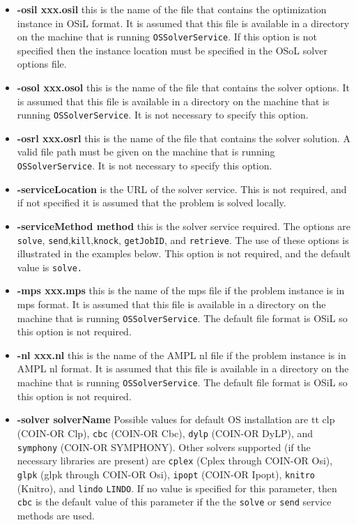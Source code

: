 \documentclass[11pt]{article}
\renewcommand{\_}{{\char"5F}}
\renewcommand{\{}{{\char"7B}}
\renewcommand{\}}{{\char"7D}}
\renewcommand{\^}{{\char"0D}}
\renewcommand{\'}{{\char"0D}}
\begin{document}
\begin{itemize}

\item[] {\bf -osil xxx.osil}  this is the name of the file that contains the optimization instance in OSiL format. It is assumed that this file is available in a directory on the machine that is running {\tt OSSolverService}. If this option is not specified then the instance location must be specified in the OSoL solver options file.

\item[] {\bf -osol xxx.osol}  this is the name of the file that contains the solver options. It is assumed that this file is available in a directory on the machine that is running {\tt OSSolverService}. It is not necessary to specify this option.

\item[] {\bf -osrl xxx.osrl}  this is the name of the file that contains the solver solution. A valid file path must be given on the machine that is running {\tt OSSolverService}. It is not necessary to specify this option.

\item[] {\bf -serviceLocation}  is the URL of the solver service. This is not required, and if not specified it is assumed that the problem is solved locally. 

\item[] {\bf -serviceMethod  method}  this is  the solver service required. The options are {\tt solve}, {\tt send},{\tt kill},{\tt knock}, {\tt getJobID}, and {\tt retrieve}. The use of these options is illustrated in the examples below. This option is not required, and the default value is {\tt solve.}

\item[] {\bf -mps  xxx.mps}  this is the name of the mps file if the problem instance is in mps format. It is assumed that this file is available in a directory on the machine that is running {\tt OSSolverService}. The default file format is OSiL so this option is not required.

\item[] {\bf -nl  xxx.nl}  this is the name of the AMPL nl file if the problem instance is in AMPL nl  format. It is assumed that this file is available in a directory on the machine that is running {\tt OSSolverService}. The default file format is OSiL so this option is not required.

\item[] {\bf -solver  solverName}  Possible values for default OS installation are {tt clp} (COIN-OR Clp), {\tt cbc} (COIN-OR Cbc), {\tt dylp} (COIN-OR DyLP), and {\tt symphony} (COIN-OR SYMPHONY). Other solvers supported (if the necessary libraries are present) are {\tt cplex} (Cplex through COIN-OR Osi), {\tt glpk} (glpk through COIN-OR Osi), {\tt ipopt} (COIN-OR Ipopt),  {\tt knitro} (Knitro), and {\tt lindo} {\tt LINDO}. If no value is specified for this parameter, then {\tt cbc} is the default value of this parameter if the the {\tt solve} or {\tt send} service methods are used.



\end{itemize}
\end{document}
